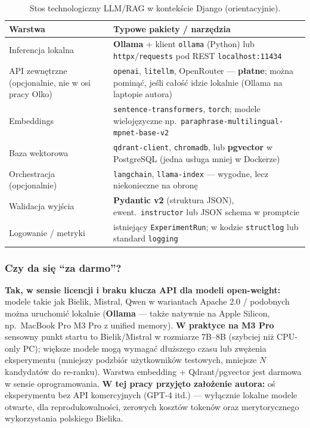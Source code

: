 \documentclass[a4paper,11pt]{article}
\newcommand{\code}[1]{\texttt{\small #1}}
\begin{document}
\begin{table}[H]
\centering
\footnotesize
\begin{tabularx}{\textwidth}{l Y}
\toprule
\textbf{Warstwa} & \textbf{Typowe pakiety / narzędzia} \\
\midrule
Inferencja lokalna & \textbf{Ollama} + klient \code{ollama} (Python) lub \code{httpx}/\code{requests} pod REST \code{localhost:11434} \\
API zewnętrzne (opcjonalnie, nie w osi pracy Olko) & \code{openai}, \code{litellm}, OpenRouter --- \textbf{płatne}; można pominąć, jeśli całość idzie lokalnie (Ollama na laptopie autora) \\
Embeddings & \code{sentence-transformers}, \code{torch}; modele wielojęzyczne np.\ \code{paraphrase-multilingual-mpnet-base-v2} \\
Baza wektorowa & \code{qdrant-client}, \code{chromadb}, lub \textbf{pgvector} w PostgreSQL (jedna usługa mniej w Dockerze) \\
Orchestracja (opcjonalnie) & \code{langchain}, \code{llama-index} --- wygodne, lecz niekonieczne na obronę \\
Walidacja wyjścia & \textbf{Pydantic v2} (struktura JSON), ewent.\ \code{instructor} lub JSON schema w promptcie \\
Logowanie / metryki & istniejący \code{ExperimentRun}; w kodzie \code{structlog} lub standard \code{logging} \\
\bottomrule
\end{tabularx}
\caption{Stos technologiczny LLM/RAG w kontekście Django (orientacyjnie).}
\end{table}

\subsubsection{Czy da się ``za darmo''?}

\textbf{Tak, w sensie licencji i braku klucza API dla modeli open-weight:} modele takie jak Bielik, Mistral, Qwen w wariantach Apache 2.0 / podobnych można uruchomić lokalnie (\textbf{Ollama} --- także natywnie na Apple Silicon, np.\ MacBook Pro M3 Pro z unified memory). \textbf{W praktyce na M3 Pro} sensowny punkt startu to Bielik/Mistral w rozmiarze 7B--8B (szybciej niż CPU-only PC); większe modele mogą wymagać dłuższego czasu lub zwężenia eksperymentu (mniejszy podzbiór użytkowników testowych, mniejsze $N$ kandydatów do re-ranku). Warstwa embedding + Qdrant/pgvector jest darmowa w sensie oprogramowania. \textbf{W tej pracy przyjęto założenie autora:} oś eksperymentu bez API komercyjnych (GPT-4 itd.) --- wyłącznie lokalne modele otwarte, dla reprodukowalności, zerowych kosztów tokenów oraz merytorycznego wykorzystania polskiego Bielika.
\end{document}
